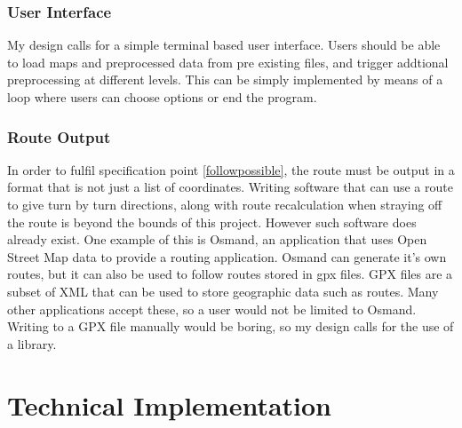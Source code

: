 \documentclass[11pt,twoside,a4paper]{article}
\begin{document}
\subsubsection{User Interface}
My design calls for a simple terminal based user interface. Users should be able to load maps and preprocessed data from pre existing files, and trigger addtional preprocessing at different levels. This can be simply implemented by means of a loop where users can choose options or end the program.
\subsubsection{Route Output}
In order to fulfil specification point \ref{followpossible}, the route must be output in a format that is not just a list of coordinates. Writing software that can use a route to give turn by turn directions, 
along with route recalculation when straying off the route is beyond the bounds of this project. However such software does already exist. One example of this is Osmand, an application that uses Open Street Map data to provide a routing application.
Osmand can generate it's own routes, but it can also be used to follow routes stored in gpx files. GPX files are a subset of XML that can be used to store geographic data such as routes. Many other applications accept these, so a user would not 
be limited to Osmand. Writing to a GPX file manually would be boring, so my design calls for the use of a library. 
\newpage
\section{Technical Implementation}
\end{document}
